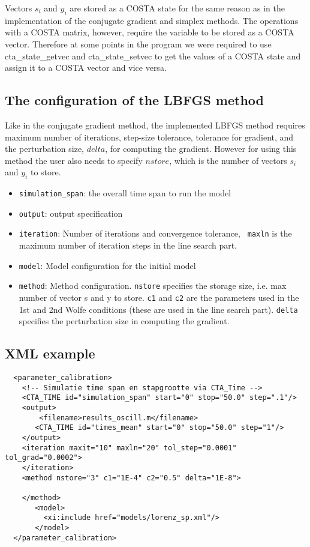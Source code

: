 Vectors $s_i$ and $y_i$ are stored as a COSTA state for the same reason as in
the implementation of the conjugate gradient and simplex methods. The
operations with a COSTA matrix, however, require the variable to be stored as a 
COSTA vector. Therefore at some points in the program we were required to
use cta\_state\_getvec and cta\_state\_setvec to get the values of a COSTA
state and assign it to a COSTA vector and vice versa.

\subsection{The configuration of the LBFGS method}

Like in the conjugate gradient method, the implemented LBFGS method
requires maximum number of iterations, step-size tolerance, tolerance for
gradient, and the perturbation size, $delta$, for computing the gradient.
However for using this method the user also needs to specify $nstore$,
which is the number of vectors $s_i$ and $y_i$ to store.

\begin{itemize}
\item {\tt simulation\_span}: the overall time span to run the model
\item {\tt output}: output specification
\item {\tt iteration}: Number of iterations and convergence tolerance, {\tt
  maxln} is the maximum number of iteration steps in the line search part.
\item {\tt model}: Model configuration for the initial model
\item {\tt method}: Method configuration.
    {\tt nstore} specifies the storage size, i.e. max number of vector s and y to store.
    {\tt c1} and {\tt c2} are the parameters used in the 1st and 2nd Wolfe
    conditions (these are used in the line search part). 
    {\tt delta} specifies the perturbation size in computing the gradient.
\end{itemize}


\subsection{XML example}
\begin{verbatim}
  <parameter_calibration>
    <!-- Simulatie time span en stapgrootte via CTA_Time -->
    <CTA_TIME id="simulation_span" start="0" stop="50.0" step=".1"/>
    <output>
        <filename>results_oscill.m</filename> 
       <CTA_TIME id="times_mean" start="0" stop="50.0" step="1"/>
    </output>
    <iteration maxit="10" maxln="20" tol_step="0.0001" tol_grad="0.0002">
    </iteration>
    <method nstore="3" c1="1E-4" c2="0.5" delta="1E-8">

    </method>
       <model>
         <xi:include href="models/lorenz_sp.xml"/>
       </model>
  </parameter_calibration>
\end{verbatim}

